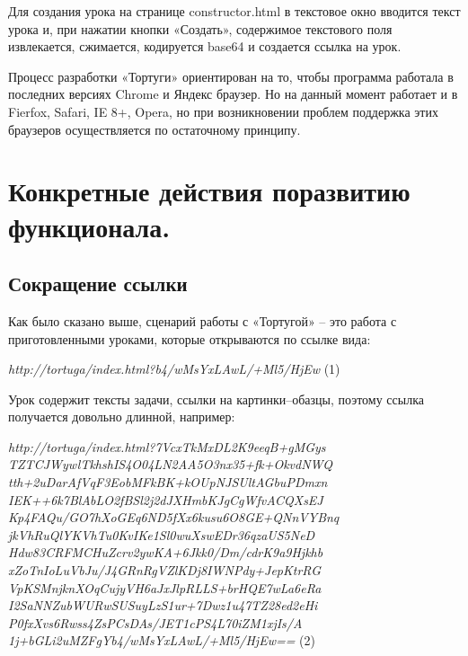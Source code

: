 Для создания урока на странице constructor.html в текстовое окно вводится текст урока и, при нажатии кнопки «Создать», содержимое текстового поля извлекается, сжимается, кодируется base64 и создается ссылка на урок.\par
Процесс разработки «Тортуги» ориентирован на то, чтобы программа работала в последних версиях Chrome и Яндекс браузер. Но на данный момент работает и в Fierfox, Safari, IE 8+, Opera, но при возникновении проблем поддержка этих браузеров осуществляется по остаточному принципу.\par

\chapter{Конкретные действия поразвитию функционала.} \label{chapt2}

\section{Сокращение ссылки} \label{sect1_1}

Как было сказано выше, сценарий работы с «Тортугой» – это работа с приготовленными уроками, которые открываются по ссылке вида: \par
\vspace{6mm}
\begin{center}
 \textit{ http://tortuga/index.html?b4/wMsYxLAwL/+Ml5/HjEw } (1)\par

\end{center}
\vspace{6mm}

Урок содержит тексты задачи, ссылки на картинки–обазцы, поэтому ссылка получается довольно длинной, например: \par

\begin{center}
\vspace{6mm}
 \textit{ http://tortuga/index.html?7VcxTkMxDL2K9eeqB+gMGys
 TZTCJWywlTkhshIS4O04LN2AA5O3nx35+fk+OkvdNWQ
 tth+2uDarAfVqF3EobMFkBK+kOUpNJSUltAGbuPDmxn
 IEK++6k7BlAbLO2fBSl2j2dJXHmbKJgCgWfvACQXsEJ
 Kp4FAQu/GO7hXoGEq6ND5fXx6kusu6O8GE+QNnVYBnq
 jkVhRuQlYKVhTu0KvIKe1Sl0wuXswEDr36qzaUS5NeD
 Hdw83CRFMCHuZcrv2ywKA+6Jkk0/Dm/cdrK9a9Hjkhb
 xZoTnIoLuVbJu/J4GRnRgVZlKDj8IWNPdy+JepKtrRG
 VpKSMnjknXOqCujyVH6aJxJlpRLLS+brHQE7wLa6eRa
 I2SaNNZubWURwSUSuyLzS1ur+7Dwz1u47TZ28ed2eHi
 P0fxXvs6Rwss4ZsPCsDAs/JET1cPS4L70iZM1xjIs/A
 1j+bGLi2uMZFgYb4/wMsYxLAwL/+Ml5/HjEw== } (2)\par
\end{center}

